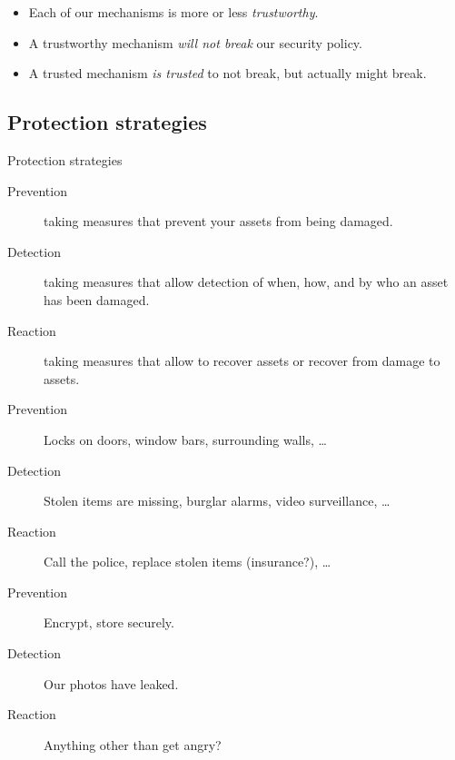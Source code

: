 \begin{frame}
  \begin{itemize}
    \item Each of our mechanisms is more or less \emph{trustworthy}.
    \item A trustworthy mechanism \emph{will not break} our security policy.
    \item A trusted mechanism \emph{is trusted} to not break, but actually 
      might break.
  \end{itemize}
\end{frame}

\subsection{Protection strategies}

\begin{frame}
  \begin{block}{Protection strategies}
    \begin{description}
      \item[Prevention] taking measures that prevent your assets from being 
        damaged.

      \item[Detection] taking measures that allow detection of when, how, and 
        by who an asset has been damaged.

      \item[Reaction] taking measures that allow to recover assets or recover 
        from damage to assets.
    \end{description}
  \end{block}
\end{frame}

\begin{frame}
  \begin{example}
    \begin{description}
      \item[Prevention] Locks on doors, window bars, surrounding walls, \dots
      \item[Detection] Stolen items are missing, burglar alarms, video 
        surveillance, \dots
      \item[Reaction] Call the police, replace stolen items (insurance?), \dots
    \end{description}
  \end{example}

  \pause

  \begin{example}
    \begin{description}
      \item[Prevention] Encrypt, store securely.
      \item[Detection] Our photos have leaked.
      \item[Reaction] Anything other than get angry?
    \end{description}
  \end{example}
\end{frame}

